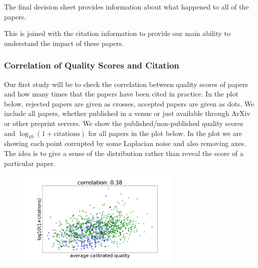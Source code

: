 The final decision sheet provides information about what happened to all
of the papers.

\begin{Shaded}
\begin{Highlighting}[]
\OperatorTok{=}
\end{Highlighting}
\end{Shaded}

This is joined with the citation information to provide our main ability
to understand the impact of these papers.

\begin{Shaded}
\begin{Highlighting}[]
\OperatorTok{=}
\end{Highlighting}
\end{Shaded}

\hypertarget{correlation-of-quality-scores-and-citation}{%
\subsubsection{Correlation of Quality Scores and
Citation}\label{correlation-of-quality-scores-and-citation}}

Our first study will be to check the correlation between quality scores
of papers and how many times that the papers have been cited in
practice. In the plot below, rejected papers are given as crosses,
accepted papers are given as dots. We include all papers, whether
published in a venue or just available through ArXiv or other preprint
servers. We show the published/non-published quality scores and
\(\log_{10}(1+\text{citations})\) for all papers in the plot below. In
the plot we are showing each point corrupted by some Laplacian noise and
also removing axes. The idea is to give a sense of the distribution
rather than reveal the score of a particular paper.

\begin{figure}[htb]
\includegraphics[width=0.70\textwidth]{diagrams/neurips/citations-vs-average-calibrated-quality-all.pdf}


\caption{}
\label{citations-vs-average-calibrated-quality-all}
\end{figure}


